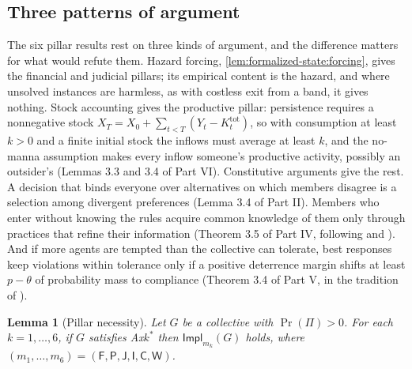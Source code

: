 \documentclass[11pt,letterpaper]{article}
\newtheorem{lemma}[theorem]{Lemma}
\theoremstyle{definition}
\theoremstyle{remark}
\newcommand{\pF}{\mathsf{F}}
\newcommand{\pP}{\mathsf{P}}
\newcommand{\pJ}{\mathsf{J}}
\newcommand{\pI}{\mathsf{I}}
\newcommand{\pC}{\mathsf{C}}
\newcommand{\pW}{\mathsf{W}}
\newcommand{\Impl}{\mathsf{Impl}}
\begin{document}
\subsection{Three patterns of argument}

The six pillar results rest on three kinds of argument, and the difference matters for what would refute them. Hazard forcing, \cref{lem:formalized-state:forcing}, gives the financial and judicial pillars; its empirical content is the hazard, and where unsolved instances are harmless, as with costless exit from a band, it gives nothing. Stock accounting gives the productive pillar: persistence requires a nonnegative stock $X_T=X_0+\sum_{t<T}(Y_t-K^{\mathrm{tot}}_t)$, so with consumption at least $k>0$ and a finite initial stock the inflows must average at least $k$, and the no-manna assumption makes every inflow someone's productive activity, possibly an outsider's (Lemmas 3.3 and 3.4 of Part VI). Constitutive arguments give the rest. A decision that binds everyone over alternatives on which members disagree is a selection among divergent preferences (Lemma 3.4 of Part II). Members who enter without knowing the rules acquire common knowledge of them only through practices that refine their information (Theorem 3.5 of Part IV, following \citealt{lewis1969} and \citealt{aumann1976}). And if more agents are tempted than the collective can tolerate, best responses keep violations within tolerance only if a positive deterrence margin shifts at least $p-\theta$ of probability mass to compliance (Theorem 3.4 of Part V, in the tradition of \citealt{becker1968}).

\begin{lemma}[Pillar necessity]
\label{lem:formalized-state:pillars}
Let $G$ be a collective with $\Pr(\Pi)>0$. For each $k=1,\dots,6$, if $G$ satisfies Ax$k^{*}$ then $\Impl_{m_k}(G)$ holds, where $(m_1,\dots,m_6)=(\pF,\pP,\pJ,\pI,\pC,\pW)$.
\end{lemma}
\end{document}
